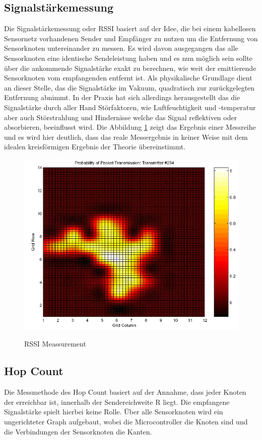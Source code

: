 \subsection{Signalstärkemessung}
Die Signalstärkemessung oder \ac{RSSI} basiert auf der Idee, die bei einem kabellosen Sensornetz vorhandenen Sender und Empfänger zu nutzen um die 
Entfernung von Sensorknoten untereinander zu messen. Es wird davon ausgegangen das alle Sensorknoten eine identische Sendeleistung haben und es nun
möglich sein sollte über die ankommende Signalstärke exakt zu berechnen, wie weit der emittierende Sensorknoten vom empfangenden entfernt ist. Als 
physikalische Grundlage dient an dieser Stelle, das die Signalstärke im Vakuum, quadratisch zur zurückgelegten Entfernung abnimmt. In der Praxis 
hat sich allerdings herausgestellt das die Signalstärke durch aller Hand Störfaktoren, wie Luftfeuchtigkeit und -temperatur aber auch Störstrahlung 
und Hindernisse welche das Signal reflektiven oder absorbieren, beeinflusst wird. Die Abbildung \ref{fig:RSSI} zeigt das Ergebnis einer Messreihe und es 
wird hier deutlich, dass das reale Messergebnis in keiner Weise mit dem idealen kreisförmigen Ergebnis der Theorie übereinstimmt. \cite{whitehouse}

\begin{figure}[h!]
  \centering
  \includegraphics[scale=0.75]{img/RSSI1}\\
  \label{fig:RSSI}
  \caption{RSSI Meassurement}
\end{figure}

\subsection{Hop Count}
Die Messmethode des Hop Count basiert auf der Annahme, dass jeder Knoten der erreichbar ist, innerhalb der Sendereichweite R liegt. Die empfangene
Signalstärke spielt hierbei keine Rolle. Über alle Sensorknoten wird
ein ungerichteter Graph aufgebaut, wobei die Microcontroller die
Knoten sind und die Verbindungen der Sensorknoten die Kanten.

